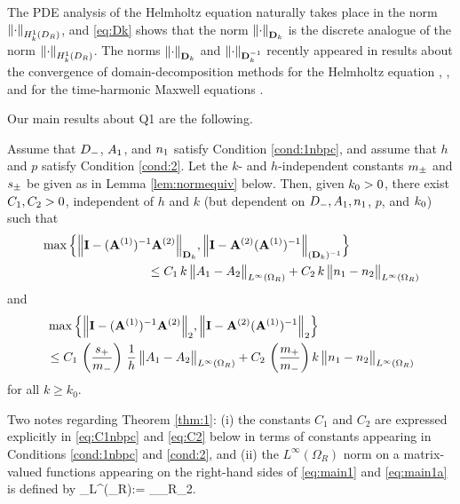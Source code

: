 The PDE analysis of the Helmholtz equation naturally takes place in the norm $\NHokDR{\cdot}$, and \eqref{eq:Dk} shows that the norm $\NDmatk{\cdot}$ is
the discrete analogue of the norm $\NHokDR{\cdot}$. %
The norms $\NDmatk{\cdot}$ and $\NDmatkI{\cdot}$ recently appeared in results about the convergence of domain-decomposition methods %
for the Helmholtz equation \cite{GrSpVa:17}, \cite{GrSpZo:18}, and for the time-harmonic Maxwell equations \cite{BoDoGrSpTo:19}. 

Our main results about Q1 are the following.

\begin{theorem}\label{thm:1}
Assume that $D_{-}$, $A_{1}$, and $n_{1}$ satisfy Condition \ref{cond:1nbpc}, and assume that $h$ and $p$ satisfy Condition \ref{cond:2}. 
Let the $k$- and $h$-independent constants $m_{\pm}$ and $s_{\pm}$ be given as in Lemma \ref{lem:normequiv} below.
Then, given $k_{0}>0$, there exist $C_{1}, C_{2}>0$, independent of $h$ and $k$ (but dependent on $D_{-}, A_{1}, n_{1}$, $p$, and $k_{0}$) such that
\begin{align}\nonumber
&\max\Big\{
\NDmatk{\Imat - (\Amat^{(1)})^{-1}\Amat^{(2)}}, 
\N{\Imat -\Amat^{(2)} (\Amat^{(1)})^{-1}}_{(\Dmat_k)^{-1}}
\Big\}\\
&\hspace{3cm} 
\leq C_1 \,k \,
\big\|\Ao-\At\big\|_{L^\infty(\Omega_R)} + C_2 \, k \, \big\|\no-\nt\big\|_{L^\infty(\Omega_R)}
\label{eq:main1}
\end{align}
and 
\begin{align}\nonumber
&\max\Big\{
\N{\Imat - (\Amat^{(1)})^{-1}\Amat^{(2)}}_2, 
\N{\Imat -\Amat^{(2)} (\Amat^{(1)})^{-1}}_2
\Big\}\\
&\hspace{0cm} 
\leq C_1 \,\left(\frac{s_+}{m_-}\right) \,\frac{1}{h} \,
\big\|\Ao-\At\big\|_{L^\infty(\Omega_R)} + C_2 \, \left(\frac{m_+}{m_-} \right)k \, \big\|\no-\nt\big\|_{L^\infty(\Omega_R)}
\label{eq:main1a}
\end{align}
for all $k\geq k_0$. 
\end{theorem}

Two notes regarding Theorem \ref{thm:1}: (i) the constants $C_1$ and $C_2$ are expressed explicitly in \eqref{eq:C1nbpc} and \eqref{eq:C2} below in terms of constants appearing in Conditions \ref{cond:1nbpc} and \ref{cond:2}, and (ii) the $L^\infty(\Omega_R)$ norm on a matrix-valued functions appearing on the right-hand sides of \eqref{eq:main1} and \eqref{eq:main1a} is defined by
\beqs
{}_{L^\infty(\Omega_R)}:= \esssup_{\bx\in\Omega_R}_2.
\eeqs

